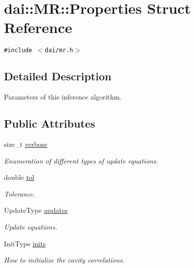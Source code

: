 \hypertarget{structdai_1_1MR_1_1Properties}{
\section{dai::MR::Properties Struct Reference}
\label{structdai_1_1MR_1_1Properties}
}
{\tt \#include $<$dai/mr.h$>$}



\subsection{Detailed Description}
Parameters of this inference algorithm. \subsection*{Public Attributes}
\begin{CompactItemize}
\item 
size\_\-t \hyperlink{structdai_1_1MR_1_1Properties_e0281396e1ee677e1b6ae15f9ae67f99}{verbose}
\begin{CompactList}\small\item\em Enumeration of different types of update equations. \item\end{CompactList}\item 
\hypertarget{structdai_1_1MR_1_1Properties_94665674b559c260c67d45688b829bfe}{
double \hyperlink{structdai_1_1MR_1_1Properties_94665674b559c260c67d45688b829bfe}{tol}}
\label{structdai_1_1MR_1_1Properties_94665674b559c260c67d45688b829bfe}

\begin{CompactList}\small\item\em Tolerance. \item\end{CompactList}\item 
\hypertarget{structdai_1_1MR_1_1Properties_f1e2899da2779d1b0d7640f87d899f17}{
UpdateType \hyperlink{structdai_1_1MR_1_1Properties_f1e2899da2779d1b0d7640f87d899f17}{updates}}
\label{structdai_1_1MR_1_1Properties_f1e2899da2779d1b0d7640f87d899f17}

\begin{CompactList}\small\item\em Update equations. \item\end{CompactList}\item 
\hypertarget{structdai_1_1MR_1_1Properties_5c400e8635d85478270d653a8a7f351b}{
InitType \hyperlink{structdai_1_1MR_1_1Properties_5c400e8635d85478270d653a8a7f351b}{inits}}
\label{structdai_1_1MR_1_1Properties_5c400e8635d85478270d653a8a7f351b}

\begin{CompactList}\small\item\em How to initialize the cavity correlations. \item\end{CompactList}\end{CompactItemize}


